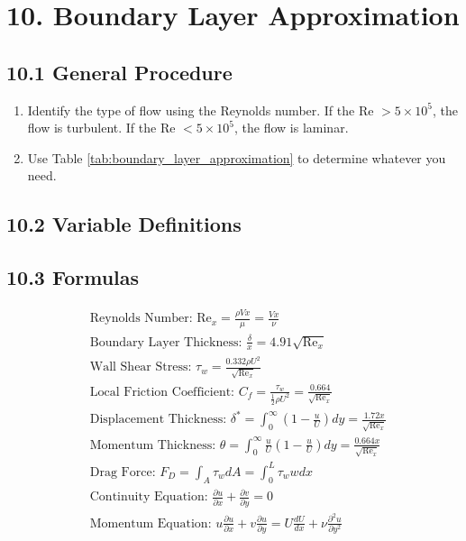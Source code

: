 \section*{10. Boundary Layer Approximation}
\subsection*{10.1 General Procedure}
\begin{enumerate}
    \item Identify the type of flow using the Reynolds number. If the Re $> 5 \times 10^5$, the flow is turbulent. If the Re $< 5 \times 10^5$, the flow is laminar.
    \item Use Table \ref{tab:boundary_layer_approximation} to determine whatever you need.
\end{enumerate}

\subsection*{10.2 Variable Definitions}

\subsection*{10.3 Formulas}
\begin{fleqn}
    \begin{align*}
        &\text{Reynolds Number: } \text{Re}_x = \frac{\rho V x}{\mu}  = \frac{V x}{\nu} \\
        &\text{Boundary Layer Thickness: } \frac{\delta}{x} = 4.91 \sqrt{\text{Re}_x} \\
        &\text{Wall Shear Stress: } \tau_w = \frac{0.332 \rho U^2}{\sqrt{\text{Re}_x}} \\
        &\text{Local Friction Coefficient: } C_f = \frac{\tau_w}{\frac{1}{2} \rho U^2} = \frac{0.664}{\sqrt{\text{Re}_x}} \\
        &\text{Displacement Thickness: } \delta^* = \int_0^\infty \left(1 - \frac{u}{U}\right) dy = \frac{1.72 x}{\sqrt{\text{Re}_x}} \\
        &\text{Momentum Thickness: } \theta = \int_0^\infty \frac{u}{U} \left(1 - \frac{u}{U}\right) dy = \frac{0.664 x}{\sqrt{\text{Re}_x}} \\   
        &\text{Drag Force: } F_D = \int_A \tau_w dA = \int_0^L \tau_w w dx \\
        &\text{Continuity Equation: } \frac{\partial u}{\partial x} + \frac{\partial v}{\partial y} = 0 \\
        &\text{Momentum Equation: } u \frac{\partial u}{\partial x} + v \frac{\partial u}{\partial y} = U \frac{dU}{dx} + \nu \frac{\partial^2 u}{\partial y^2} \\
    \end{align*}
\end{fleqn}

